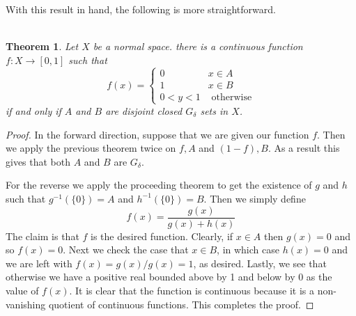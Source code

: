 \documentclass{article}
\newtheorem*{thm}{\\ Theorem}
\begin{document}
With this result in hand, the following is more straightforward. 
\begin{thm}
Let $X$ be a normal space. there is a continuous function $f: X \to [0,1]$ such that 
\[
f(x) = \begin{cases}
0 & x \in A \\
1 & x \in B  \\
0 < y < 1 & \text{ otherwise}
\end{cases}
\]
if and only if $A$ and $B$ are disjoint closed $G_\delta$ sets in $X$. 
\end{thm}
\begin{proof}
In the forward direction, suppose that we are given our function $f$. Then we apply the previous theorem twice on $f, A$ and $(1-f), B$. As a result this gives that both $A$ and $B$ are $G_\delta$. 

For the reverse we apply the proceeding theorem to get the existence of $g$ and $h$ such that $g^{-1}(\{0\}) = A$ and $h^{-1}(\{0\}) = B$. Then we simply define 
\[
f(x) = \frac{g(x)}{g(x) + h(x)}
\]
The claim is that $f$ is the desired function. Clearly, if $x \in A$ then $g(x) = 0$ and so $f(x) = 0$. Next we check the case that $x \in B$, in which case $h(x) = 0$ and we are left with $f(x) = g(x)/g(x) = 1$, as desired. Lastly, we see that otherwise we have a positive real bounded above by 1 and below by 0 as the value of $f(x)$. It is clear that the function is continuous because it is a non-vanishing quotient of continuous functions. This completes the proof. 
\end{proof}
\end{document}
